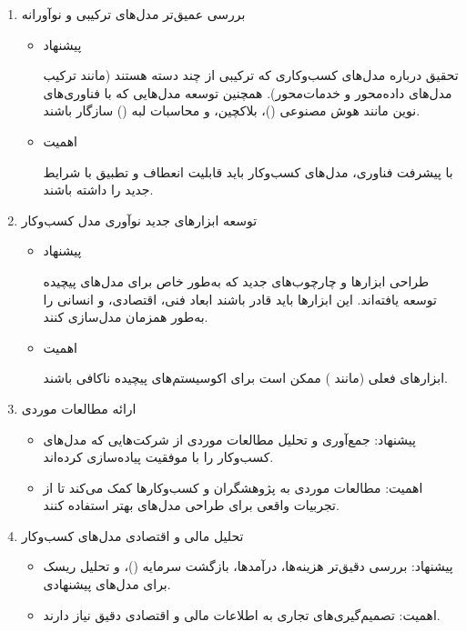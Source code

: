 \documentclass[10pt, twocolumn]{article}
\begin{document}
\begin{enumerate}
\item 
بررسی عمیق‌تر مدل‌های ترکیبی و نوآورانه 

\begin{itemize}
\item 
پیشنهاد

تحقیق درباره مدل‌های کسب‌وکاری که ترکیبی از چند دسته هستند (مانند ترکیب مدل‌های داده‌محور و خدمات‌محور). همچنین توسعه مدل‌هایی که با فناوری‌های نوین مانند هوش مصنوعی ()، بلاکچین، و محاسبات لبه () سازگار باشند.  

\item 
اهمیت

با پیشرفت فناوری، مدل‌های کسب‌وکار  باید قابلیت انعطاف و تطبیق با شرایط جدید را داشته باشند.  
\end{itemize} 

\item 
توسعه ابزارهای جدید نوآوری مدل کسب‌وکار  

\begin{itemize}
\item 
پیشنهاد

طراحی ابزارها و چارچوب‌های جدید که به‌طور خاص برای مدل‌های پیچیده  توسعه یافته‌اند. این ابزارها باید قادر باشند ابعاد فنی، اقتصادی، و انسانی  را به‌طور همزمان مدل‌سازی کنند.  

\item 
اهمیت

ابزارهای فعلی (مانند ) ممکن است برای اکوسیستم‌های پیچیده  ناکافی باشند.  
\end{itemize}

\item

ارائه مطالعات موردی   

\begin{itemize}
\item پیشنهاد: جمع‌آوری و تحلیل مطالعات موردی از شرکت‌هایی که مدل‌های کسب‌وکار  را با موفقیت پیاده‌سازی کرده‌اند.  
\item اهمیت: مطالعات موردی به پژوهشگران و کسب‌وکارها کمک می‌کند تا از تجربیات واقعی برای طراحی مدل‌های بهتر استفاده کنند.  
\end{itemize}

\item 
تحلیل مالی و اقتصادی مدل‌های کسب‌وکار   

\begin{itemize}
\item پیشنهاد: بررسی دقیق‌تر هزینه‌ها، درآمدها، بازگشت سرمایه ()، و تحلیل ریسک برای مدل‌های پیشنهادی.  
\item اهمیت: تصمیم‌گیری‌های تجاری به اطلاعات مالی و اقتصادی دقیق نیاز دارند.  
\end{itemize}


\end{enumerate}
\end{document}
